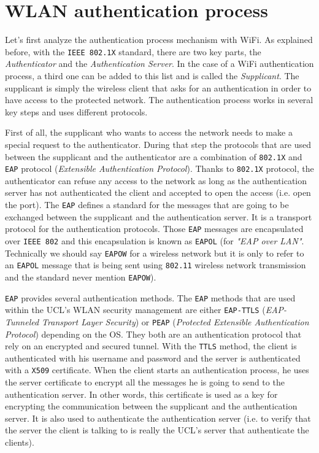 \section{WLAN authentication process}
Let's first analyze the authentication process mechanism with WiFi.
As explained before, with the \texttt{IEEE 802.1X} standard, there are two key parts, the \textit{Authenticator} and the \textit{Authentication Server}. In the case of a WiFi authentication process, a third one can be added to this list and is called the \textit{Supplicant}. The supplicant is simply the wireless client that asks for an authentication in order to have access to the protected network. The authentication process works in several key steps and uses different protocols.

First of all, the supplicant who wants to access the network needs to make a special request to the authenticator. During that step the protocols that are used between the supplicant and the authenticator are a combination of \texttt{802.1X} and \texttt{EAP} protocol (\textit{Extensible Authentication Protocol}). Thanks to \texttt{802.1X} protocol, the authenticator can refuse any access to the network as long as the authentication server has not authenticated the client and accepted to open the access (i.e. open the port). The \texttt{EAP} defines a standard for the messages that are going to be exchanged between the supplicant and the authentication server. It is a  transport protocol for the authentication protocols. Those \texttt{EAP} messages are encapsulated over \texttt{IEEE 802} and this encapsulation is known as \texttt{EAPOL} (for \textit{"EAP over LAN"}. Technically we should say \texttt{EAPOW} for a wireless network but it is only to refer to an \texttt{EAPOL} message that is being sent using \texttt{802.11} wireless network transmission and the standard never mention \texttt{EAPOW}).

\texttt{EAP} provides several authentication methods. The \texttt{EAP} methods that are used within the UCL's WLAN  security management are either \texttt{EAP-TTLS} (\textit{EAP-Tunneled Transport Layer Security}) or \texttt{PEAP} (\textit{Protected Extensible Authentication Protocol}) depending on the OS. They both are an authentication protocol that rely on an encrypted and secured tunnel. With the \texttt{TTLS} method, the client is authenticated with his username and password and the server is authenticated with a \texttt{X509} certificate. When the client starts an authentication process, he uses the server certificate to encrypt all the messages he is going to send to the authentication server. In other words, this certificate is used as a key for encrypting the communication between the supplicant and the authentication server. It is also used to authenticate the authentication server (i.e. to verify that the server the client is talking to is really the UCL's server that authenticate the clients).


